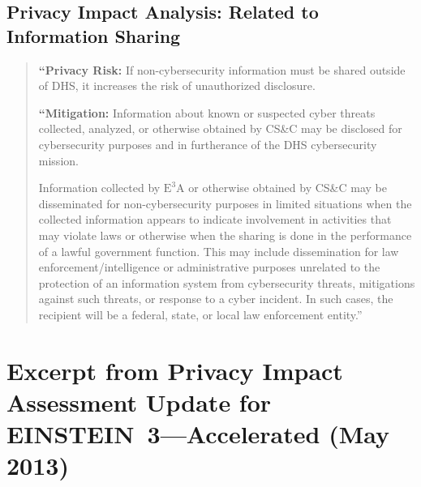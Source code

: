 \documentclass[fleqn,12pt]{wlscirep}
\newcommand{\ETA}{$\textrm{E}^\textrm{3}\textrm{A}$\xspace}
\begin{document}
\subsection{Privacy Impact Analysis: Related to Information Sharing}\label{excerpt3}
\begin{quote}
  \textbf{``Privacy Risk:} If non-cybersecurity information must be shared outside of DHS, it
increases the risk of unauthorized disclosure.

  \textbf{``Mitigation:} Information about known or suspected cyber threats collected,
analyzed, or otherwise obtained by CS\&C may be disclosed for cybersecurity purposes
and in furtherance of the DHS cybersecurity mission.

Information collected by \ETA or otherwise obtained by CS\&C may be
disseminated for non-cybersecurity purposes in limited situations when the collected
information appears to indicate involvement in activities that may violate laws or
otherwise when the sharing is done in the performance of a lawful government function.
This may include dissemination for law enforcement/intelligence or administrative
purposes unrelated to the protection of an information system from cybersecurity threats,
mitigations against such threats, or response to a cyber incident. In such cases, the
recipient will be a federal, state, or local law enforcement entity.''~\cite[p.23]{dhs-e3a-pia}
\end{quote}


\section{Excerpt from Privacy Impact Assessment Update for EINSTEIN~3---Accelerated (May 2013)}
\end{document}
